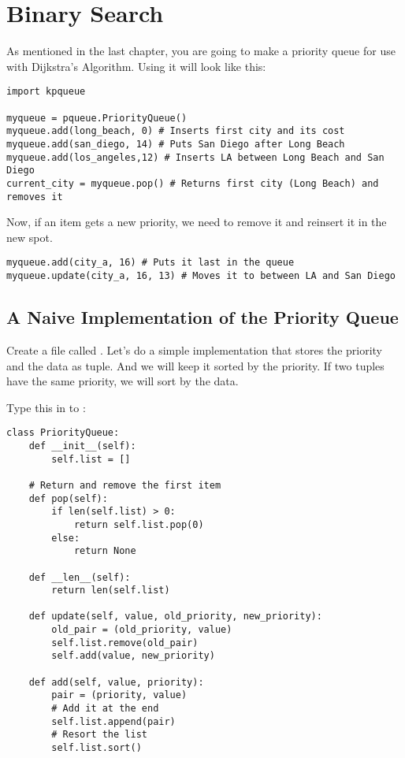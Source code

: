\chapter{Binary Search}

As mentioned in the last chapter, you are going to make a priority
queue for use with Dijkstra's Algorithm.  Using it will look like this:

\begin{verbatim}
import kpqueue

myqueue = pqueue.PriorityQueue()
myqueue.add(long_beach, 0) # Inserts first city and its cost
myqueue.add(san_diego, 14) # Puts San Diego after Long Beach
myqueue.add(los_angeles,12) # Inserts LA between Long Beach and San Diego
current_city = myqueue.pop() # Returns first city (Long Beach) and removes it
\end{verbatim}

Now, if an item gets a new priority, we need to remove it and reinsert it in the new spot.
\begin{verbatim}
myqueue.add(city_a, 16) # Puts it last in the queue
myqueue.update(city_a, 16, 13) # Moves it to between LA and San Diego
\end{verbatim}

\section{A Naive Implementation of the Priority Queue}

Create a file called . Let's do a simple
implementation that stores the priority and the data as tuple. And we
will keep it sorted by the priority.  If two tuples have the same
priority, we will sort by the data.

Type this in to :
\begin{verbatim}
class PriorityQueue:
    def __init__(self):
        self.list = []
    
    # Return and remove the first item
    def pop(self):
        if len(self.list) > 0:
            return self.list.pop(0)
        else:
            return None
        
    def __len__(self):
        return len(self.list)

    def update(self, value, old_priority, new_priority):
        old_pair = (old_priority, value)
        self.list.remove(old_pair)
        self.add(value, new_priority)
    
    def add(self, value, priority):
        pair = (priority, value)
        # Add it at the end
        self.list.append(pair)
        # Resort the list
        self.list.sort()
\end{verbatim}

